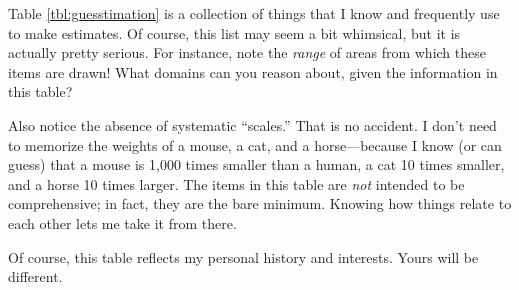 Table \ref{tbl:guesstimation} is a collection of things that I know
and frequently use to make estimates. Of course, this list
may seem a bit whimsical, but it is actually pretty serious. For
instance, note the \emph{range} of areas from which these items are
drawn! What domains can you reason about, given the information in
this table?
    
Also notice the absence of systematic ``scales.'' That is no accident.
I don't need to memorize the weights of a mouse, a cat, and a
horse---because I know (or can guess) that a mouse is 1,000 times
smaller than a human, a cat 10 times smaller, and a horse 10 times
larger. The items in this table are \emph{not} intended to be
comprehensive; in fact, they are the bare minimum. Knowing how things
relate to each other lets me take it from there.
    
Of course, this table reflects my personal history and interests.
Yours will be different.



